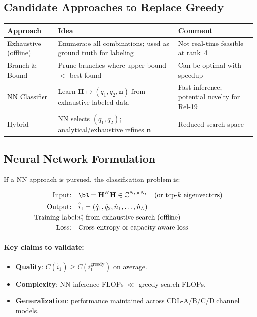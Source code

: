 \documentclass[12pt, a4paper]{article}
\newcommand{\bH}{\mathbf{H}}
\newcommand{\C}{\mathbb{C}}
\begin{document}
\subsection{Candidate Approaches to Replace Greedy}

\begin{center}
\begin{tabular}{lp{6cm}p{4cm}}
\toprule
Approach & Idea & Comment \\
\midrule
Exhaustive (offline) & Enumerate all combinations; used as ground truth for labeling & Not real-time feasible at rank~4 \\
Branch \& Bound & Prune branches where upper bound $<$ best found & Can be optimal with speedup \\
NN Classifier & Learn $\bH \mapsto (q_1, q_2, \mathbf{n})$ from exhaustive-labeled data & Fast inference; potential novelty for Rel-19 \\
Hybrid & NN selects $(q_1, q_2)$; analytical/exhaustive refines $\mathbf{n}$ & Reduced search space \\
\bottomrule
\end{tabular}
\end{center}

\subsection{Neural Network Formulation}

If a NN approach is pursued, the classification problem is:

\begin{align}
    \text{Input:} \quad   & \bR = \bH^H\bH \in \C^{N_t \times N_t}
                            \quad \text{(or top-}k\text{ eigenvectors)} \\
    \text{Output:} \quad  & \hat{i}_1 = (\hat{q}_1, \hat{q}_2, \hat{n}_1, \ldots, \hat{n}_L) \\
    \text{Training label:} & i_1^* \text{ from exhaustive search (offline)} \\
    \text{Loss:} \quad    & \text{Cross-entropy or capacity-aware loss}
\end{align}

\paragraph{Key claims to validate:}
\begin{itemize}
    \item \textbf{Quality}: $C(\hat{i}_1) \geq C(i_1^\mathrm{greedy})$ on average.
    \item \textbf{Complexity}: NN inference FLOPs $\ll$ greedy search FLOPs.
    \item \textbf{Generalization}: performance maintained across CDL-A/B/C/D channel models.
\end{itemize}
\end{document}
